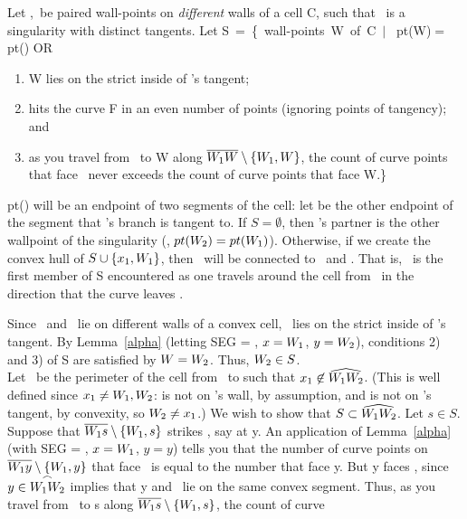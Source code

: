\begin{theorem}\nopagebreak
\label{grandwall}
Let \wone,\wtwo\ be paired wall-points on {\em different} walls of a cell C,
such that \wone\ is a singularity with distinct tangents.
Let \mbox{S = \{ wall-points W of C $\mid$ }
pt(W)$ = $pt(\wone)  OR
\begin{enumerate}
	\item W lies on the strict inside of \wone's tangent;
	\item {} hits the curve F in an
even number of points (ignoring
points of tangency); and
	\item as you travel from \wone\ to W 
along $\mbox{$\overline{\mbox{$W_{1}$} W}$} \setminus \{\mbox{$W_{1}$},W\}$, the count of curve points
that face \wone\ never exceeds the count of curve points that face W.\}
\end{enumerate}
pt(\wone) will be an endpoint of two segments
of the cell: let \xone be the other endpoint of the segment that \wone's
branch is tangent to.
If $S = \emptyset$, then \wone's partner is the other wallpoint of the
singularity (\ie, $pt(\mbox{$W_{2}$}) = pt(\mbox{$W_{1}$})$).
Otherwise, if we create the convex hull of $S \cup \{\mbox{$x_{1}$},\mbox{$W_{1}$}\}$,
then \xone\ will be connected to \wone\ and \wtwo.
That is, \wtwo\ is the first member of S encountered as one travels
around the cell from \wone\ in the direction that the curve leaves \wone.
\end{theorem}
\proof
Since \wone\ and \wtwo\ lie on different walls of a convex cell,
\wtwo\ lies on the strict inside of \wone's tangent.
By Lemma~\ref{alpha} (letting SEG = \wwa, $x = \mbox{$W_{1}$}$, $y=\mbox{$W_{2}$}$),
conditions 2) and 3) of S are satisfied by $W = \mbox{$W_{2}$}$.
Thus, $\mbox{$W_{2}$} \in S $.\\
Let \wwh\ be the perimeter of the cell from \wone\ to \wtwo
such that $\mbox{$x_{1}$} \not\in \mbox{$\widehat{\mbox{$W_{1}W_{2}$}}$}$.
(This is well defined since $\mbox{$x_{1}$} \neq \mbox{$W_{1}$},\mbox{$W_{2}$}$: \wtwo is not
on \wone's wall, by assumption, and is not on \wone's tangent, by convexity,
so $\mbox{$W_{2}$} \neq \mbox{$x_{1}$}$.)
We wish to show that $S \subset \mbox{$\widehat{\mbox{$W_{1}W_{2}$}}$}$.
Let $s\in S$.
Suppose that $\mbox{$\overline{\mbox{$W_{1}$} s}$} \setminus \{\mbox{$W_{1}$},s\}$ strikes \wwa, say at y.
An application of Lemma~\ref{alpha} (with SEG = \wwa, $x = \mbox{$W_{1}$}$, $y = y$)
tells you
that the number of curve points
on  $\mbox{$\overline{\mbox{$W_{1}$} y}$} \setminus \{\mbox{$W_{1}$},y\}$ 
that face \wone\ is equal to the number that face y.
But y faces \wone, since $y \in \mbox{$\stackrel{\frown}{\mbox{$W_{1}W_{2}$}}$}$ implies that y and \wone\ lie on the
same convex segment.
Thus, as you travel from \wone\ to s
along  $\mbox{$\overline{\mbox{$W_{1}$} s}$} \setminus \{\mbox{$W_{1}$},s\}$, the count of curve

